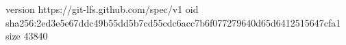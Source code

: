 version https://git-lfs.github.com/spec/v1
oid sha256:2ed3e5e67ddc49b55dd5b7cd55cdc6acc7b6f077279640d65d6412515647cfa1
size 43840
